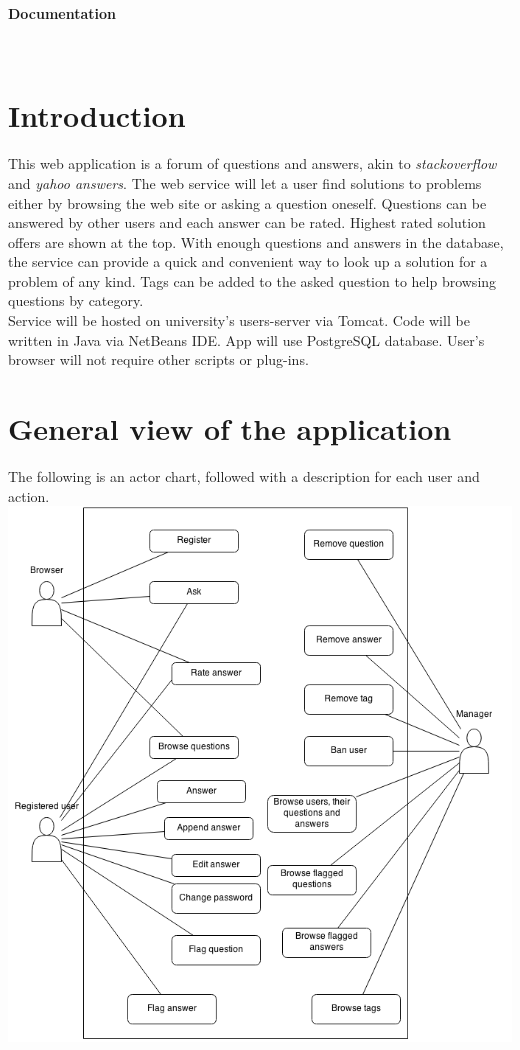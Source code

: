 \documentclass[a4paper,12pt]{article}
\begin{document}
\vspace*{\fill}
\centerline{\huge \textbf{Documentation}} \hspace*{\fill}
\vspace*{\fill}
\\
\tableofcontents
\newpage

\section{Introduction}
This web application is a forum of questions and answers, akin to \emph{stackoverflow} and \emph{yahoo answers}. The web service will let a user find solutions to problems either by browsing the web site or asking a question oneself. Questions can be answered by other users and each answer can be rated. Highest rated solution offers are shown at the top. With enough questions and answers in the database, the service can provide a quick and convenient way to look up a solution for a problem of any kind. Tags can be added to the asked question to help browsing questions by category.\\
\indent Service will be hosted on university's users-server via Tomcat. Code will be written in Java via NetBeans IDE. App will use PostgreSQL database. User's browser will not require other scripts or plug-ins.
\newpage

\section{General view of the application}
The following is an actor chart, followed with a description for each user and action.\\
\includegraphics[scale=0.6]{ActorChart}
\end{document}

